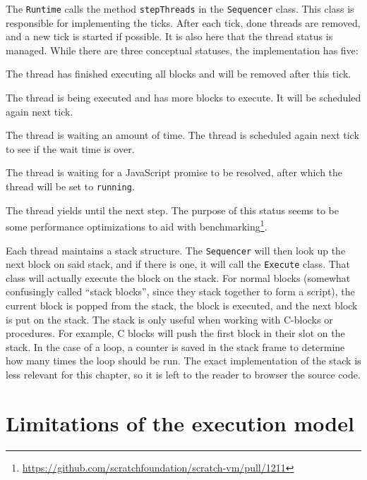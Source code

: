 \documentclass[../main]{subfiles}
\begin{document}
The \texttt{Runtime} calls the method \texttt{stepThreads} in the \texttt{Sequencer} class.
This class is responsible for implementing the ticks.
After each tick, done threads are removed, and a new tick is started if possible.
It is also here that the thread status is managed.
While there are three conceptual statuses, the implementation has five:
\begin{description}[noitemsep]
    \item[\texttt{done}] The thread has finished executing all blocks and will be removed after this tick.
    \item[\texttt{running}] The thread is being executed and has more blocks to execute.
        It will be scheduled again next tick.
    \item[\texttt{yield}] The thread is waiting an amount of time.
        The thread is scheduled again next tick to see if the wait time is over.
    \item[\texttt{promise wait}] The thread is waiting for a JavaScript promise to be resolved, after which the thread will be set to \texttt{running}.
    \item[\texttt{yield tick}] The thread yields until the next step.
        The purpose of this status seems to be some performance optimizations to aid with benchmarking\footnote{\url{https://github.com/scratchfoundation/scratch-vm/pull/1211}}.
\end{description}

Each thread maintains a stack structure.
The \texttt{Sequencer} will then look up the next block on said stack, and if there is one, it will call the \texttt{Execute} class.
That class will actually execute the block on the stack.
For normal blocks (somewhat confusingly called ``stack blocks'', since they stack together to form a script), the current block is popped from the stack, the block is executed, and the next block is put on the stack.
The stack is only useful when working with C-blocks or procedures.
For example, C blocks will push the first block in their slot on the stack.
In the case of a loop, a counter is saved in the stack frame to determine how many times the loop should be run.
The exact implementation of the stack is less relevant for this chapter, so it is left to the reader to browser the source code.

\section{Limitations of the execution model}\label{sec:limitations-of-the-execution-model-for-the-debugger}
\end{document}
